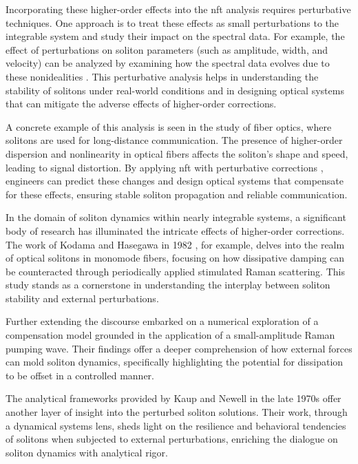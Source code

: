 Incorporating these higher-order effects into the \acrshort{nft} analysis requires perturbative techniques. One approach is to treat these effects as small perturbations to the integrable system and study their impact on the spectral data. For example, the effect of perturbations on soliton parameters (such as amplitude, width, and velocity) can be analyzed by examining how the spectral data evolves due to these nonidealities \cite{kraych2019statistical,gelash2019bound,chowdury2018modulation}. This perturbative analysis helps in understanding the stability of solitons under real-world conditions and in designing optical systems that can mitigate the adverse effects of higher-order corrections.

A concrete example of this analysis is seen in the study \cite{kivshar1989dynamics} of fiber optics, where solitons are used for long-distance communication. The presence of higher-order dispersion and nonlinearity in optical fibers affects the soliton's shape and speed, leading to signal distortion. By applying \acrshort{nft} with perturbative corrections \cite{kaup1976perturbation}, engineers can predict these changes and design optical systems that compensate for these effects, ensuring stable soliton propagation and reliable communication.


In the domain of soliton dynamics within nearly integrable systems, a significant body of research has illuminated the intricate effects of higher-order corrections. The work of Kodama and Hasegawa in 1982 \cite{kodama1982amplification}, for example, delves into the realm of optical solitons in monomode fibers, focusing on how dissipative damping can be counteracted through periodically applied stimulated Raman scattering. This study stands as a cornerstone in understanding the interplay between soliton stability and external perturbations.

Further extending the discourse \cite{dianov1985nonlinear} embarked on a numerical exploration of a compensation model grounded in the application of a small-amplitude Raman pumping wave. Their findings offer a deeper comprehension of how external forces can mold soliton dynamics, specifically highlighting the potential for dissipation to be offset in a controlled manner.

The analytical frameworks provided by Kaup and Newell in the late 1970s \cite{kaup1978solitons,kaup1978theory} offer another layer of insight into the perturbed soliton solutions. Their work, through a dynamical systems lens, sheds light on the resilience and behavioral tendencies of solitons when subjected to external perturbations, enriching the dialogue on soliton dynamics with analytical rigor.

